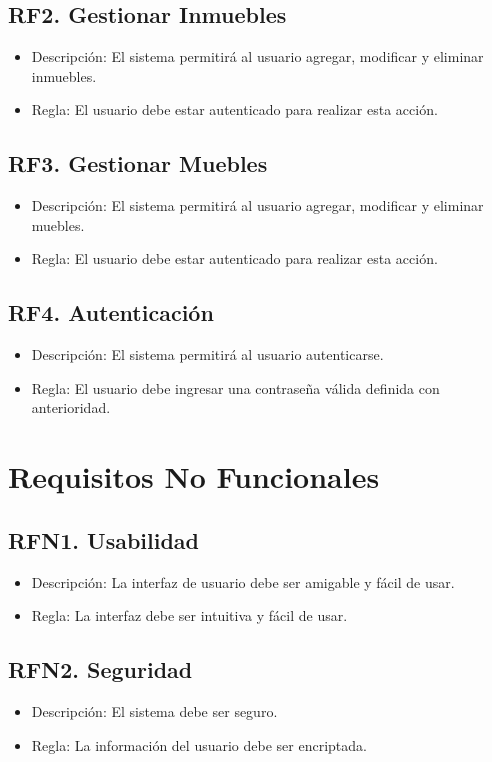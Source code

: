 \documentclass{article}
\begin{document}
\subsection{RF2. Gestionar Inmuebles}
\begin{itemize}
	\item Descripción: El sistema permitirá al usuario agregar, modificar y eliminar inmuebles.
	\item Regla: El usuario debe estar autenticado para realizar esta acción.
\end{itemize}

\subsection{RF3. Gestionar Muebles}
\begin{itemize}
	\item Descripción: El sistema permitirá al usuario agregar, modificar y eliminar muebles.
	\item Regla: El usuario debe estar autenticado para realizar esta acción.
\end{itemize}

\subsection{RF4. Autenticación}
\begin{itemize}
    \item Descripción: El sistema permitirá al usuario autenticarse.
    \item Regla: El usuario debe ingresar una contraseña válida definida con anterioridad.
\end{itemize}


\section{Requisitos No Funcionales}
\subsection{RFN1. Usabilidad}
\begin{itemize}
    \item Descripción: La interfaz de usuario debe ser amigable y fácil de usar.
    \item Regla: La interfaz debe ser intuitiva y fácil de usar.
\end{itemize}

\subsection{RFN2. Seguridad}
\begin{itemize}
    \item Descripción: El sistema debe ser seguro.
    \item Regla: La información del usuario debe ser encriptada.
\end{itemize}
\end{document}
